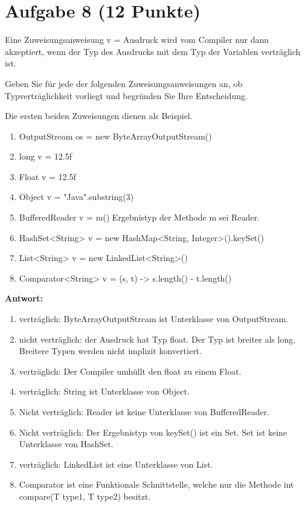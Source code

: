 \section{Aufgabe 8 (12 Punkte)}
Eine Zuweisungsanweisung v = Ausdruck wird vom Compiler nur dann akzeptiert,
wenn der Typ des Ausdrucks mit dem Typ der Variablen verträglich ist.

Geben Sie für jede der folgenden Zuweisungsanweisungen an, ob
Typverträglichkeit vorliegt und begründen Sie Ihre Entscheidung.

Die ersten beiden Zuweisungen dienen als Beispiel.

\begin{enumerate}
    \item OutputStream os = new ByteArrayOutputStream()
    \item long v = 12.5f
    \item Float v = 12.5f
    \item Object v = "Java".substring(3)
    \item BufferedReader v = m() \newline Ergebnistyp der Methode m sei Reader.
    \item HashSet<String> v = new HashMap<String, Integer>().keySet()
    \item List<String> v = new LinkedList<String>()
    \item Comparator<String> v = (s, t) -> s.length() - t.length()
\end{enumerate}

\textbf{Antwort:}

\begin{enumerate}
    \item verträglich: ByteArrayOutputStream ist Unterklasse von OutputStream.
    \item nicht verträglich: der Ausdruck hat Typ float. Der Typ ist breiter als long.
          Breitere Typen werden nicht implizit konvertiert.
    \item verträglich: Der Compiler umhüllt den float zu einem Float.
    \item verträglich: String ist Unterklasse von Object.
    \item Nicht verträglich: Reader ist keine Unterklasse von BufferedReader.
    \item Nicht verträglich: Der Ergebnistyp von keySet() ist ein Set. Set ist keine
          Unterklasse von HashSet.
    \item verträglich: LinkedList ist eine Unterklasse von List.
    \item Comparator ist eine Funktionale Schnittstelle, welche nur die Methode int
          compare(T type1, T type2) besitzt.
\end{enumerate}

